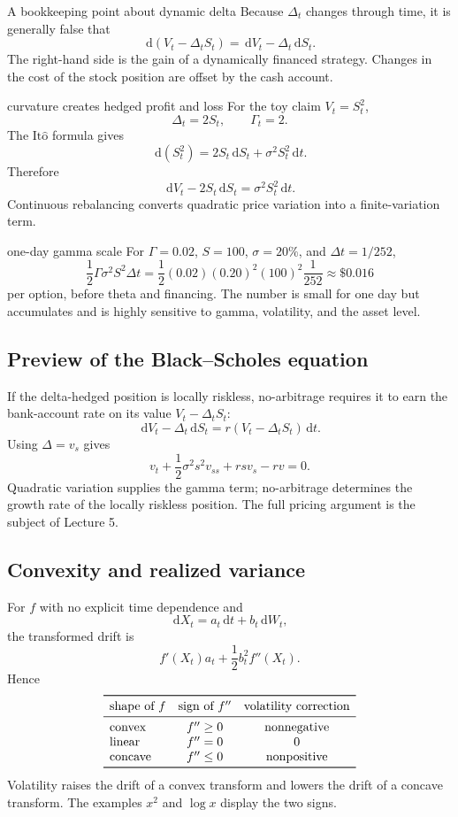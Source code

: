 \documentclass[10pt]{article}
\newcommand{\1}{\mathbf 1}
\newcommand{\dd}{\,\mathrm d}
\newcommand{\Ito}{\mathrm{It\hat{o}}}
\theoremstyle{definition}
\begin{document}
\begin{warningbox}{A bookkeeping point about dynamic delta}
Because \(\Delta_t\) changes through time, it is generally false that
\[
\dd(V_t-\Delta_tS_t)=\dd V_t-\Delta_t\dd S_t.
\]
The right-hand side is the gain of a dynamically financed strategy. Changes
in the cost of the stock position are offset by the cash account.
\end{warningbox}

\begin{boardexample}{curvature creates hedged profit and loss}
For the toy claim \(V_t=S_t^2\),
\[
\Delta_t=2S_t,\qquad \Gamma_t=2.
\]
The \(\Ito\) formula gives
\[
\dd(S_t^2)=2S_t\dd S_t+\sigma^2S_t^2\dd t.
\]
Therefore
\[
\boxed{
\dd V_t-2S_t\dd S_t=\sigma^2S_t^2\dd t.}
\]
Continuous rebalancing converts quadratic price variation into a
finite-variation term.
\end{boardexample}

\begin{boardexample}{one-day gamma scale}
For \(\Gamma=0.02\), \(S=100\), \(\sigma=20\%\), and
\(\Delta t=1/252\),
\[
\frac12\Gamma\sigma^2S^2\Delta t
=\frac12(0.02)(0.20)^2(100)^2\frac1{252}
\approx \$0.016
\]
per option, before theta and financing. The number is small for one day but
accumulates and is highly sensitive to gamma, volatility, and the asset level.
\end{boardexample}

\subsection{Preview of the Black--Scholes equation}

If the delta-hedged position is locally riskless, no-arbitrage requires it to
earn the bank-account rate on its value \(V_t-\Delta_tS_t\):
\[
\dd V_t-\Delta_t\dd S_t
=r(V_t-\Delta_tS_t)\dd t.
\]
Using \(\Delta=v_s\) gives
\[
\boxed{
v_t+\frac12\sigma^2s^2v_{ss}+rsv_s-rv=0.}
\]
Quadratic variation supplies the gamma term; no-arbitrage determines the
growth rate of the locally riskless position. The full pricing argument is
the subject of Lecture 5.

\subsection{Convexity and realized variance}

For \(f\) with no explicit time dependence and
\[
\dd X_t=a_t\dd t+b_t\dd W_t,
\]
the transformed drift is
\[
f'(X_t)a_t+\frac12b_t^2f''(X_t).
\]
Hence
\[
\begin{array}{lcc}
\toprule
\text{shape of }f & \text{sign of }f'' & \text{volatility correction}\\
\midrule
\text{convex} & f''\geq0 & \text{nonnegative}\\
\text{linear} & f''=0 & 0\\
\text{concave} & f''\leq0 & \text{nonpositive}\\
\bottomrule
\end{array}
\]
Volatility raises the drift of a convex transform and lowers the drift of a
concave transform. The examples \(x^2\) and \(\log x\) display the two signs.
\end{document}
